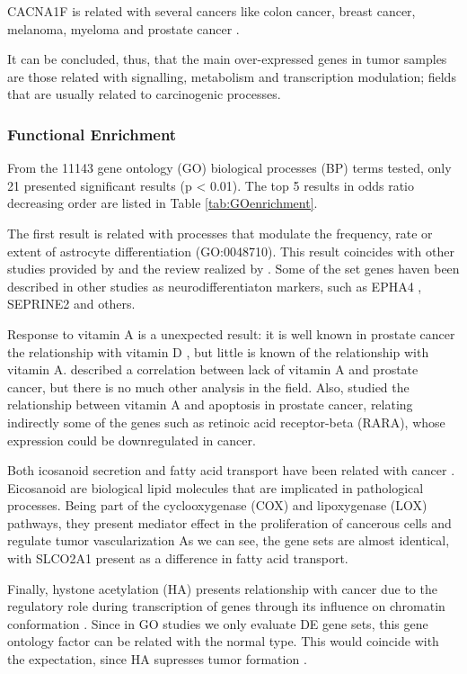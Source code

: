 \documentclass[9pt,twocolumn,twoside]{gsajnl}
\begin{document}
CACNA1F is related with several cancers like colon cancer, breast cancer, melanoma, myeloma and prostate cancer \citep{tcng}.

It can be concluded, thus, that the main over-expressed genes in tumor samples are those related with signalling, metabolism and transcription modulation; fields that are usually related to carcinogenic processes.

\subsubsection*{Functional Enrichment}

From the 11143 gene ontology (GO) biological processes (BP) terms tested, only 21 presented significant results (p < 0.01). The top 5 results in odds ratio decreasing order are listed in Table \ref{tab:GOenrichment}.

The first result is related with processes that modulate the frequency, rate or extent of astrocyte differentiation (GO:0048710). This result coincides with other studies provided by \cite{neuroendocrine3, neuroendocrine2} and the review realized by \cite{neuroendocrine1}. Some of the set genes haven been described in other studies as neurodifferentiaton markers, such as EPHA4 \cite{neuroendocrine_EPA}, SEPRINE2 \cite{mckee2013protease} and others.

Response to vitamin A is a unexpected result: it is well known in prostate cancer the relationship with vitamin D \citep{vitamin0,vitamind1,vitamind2,vitamind3}, but little is known of the relationship with vitamin A. \cite{vitamina1} described a correlation between lack of vitamin A and prostate cancer, but there is no much other analysis in the field. Also, \cite{vitamina2} studied the relationship between vitamin A and apoptosis in prostate cancer, relating indirectly some of the genes such as retinoic acid receptor-beta (RARA), whose expression could be downregulated in cancer.

Both icosanoid secretion and fatty acid transport have been related with cancer \citep{fat1,fat2}. Eicosanoid are biological lipid molecules that are implicated in pathological processes. Being part of the  cyclooxygenase (COX) and lipoxygenase (LOX) pathways, they present mediator effect in the proliferation of cancerous cells and regulate tumor vascularization \citep{fatvascu} As we can see, the gene sets are almost identical, with SLCO2A1 present as a difference in fatty acid transport.

Finally, hystone acetylation (HA) presents relationship with cancer due to the regulatory role during transcription of genes through its influence on chromatin conformation \citep{histoneacet, histoneacet2, histoneacet3, histoneacet4}. Since in GO studies we only evaluate DE gene sets, this gene ontology factor can be related with the normal type. This would coincide with the expectation, since HA supresses tumor formation \cite{histonea}.
\end{document}
